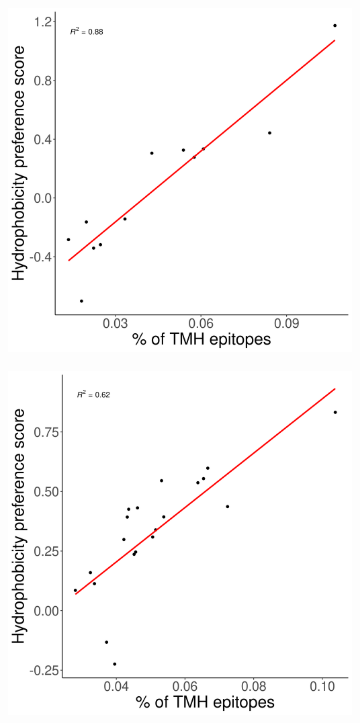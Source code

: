 \begin{figure}
  \begin{subfigure}[t]{0.4\textwidth}
    \centering
    \caption{}
    \includegraphics[width=\linewidth]{bbbq_1_smart_results/fig_hydrophobicity_mhc1.png}
    \label{fig:hydrophobicity_2}
  \end{subfigure}  
  \hfill
  \begin{subfigure}[t]{0.4\textwidth}
    \centering
    \caption{}
    \includegraphics[width=\linewidth]{bbbq_1_smart_results/fig_hydrophobicity_mhc2.png}

\end{subfigure}
\end{figure}
